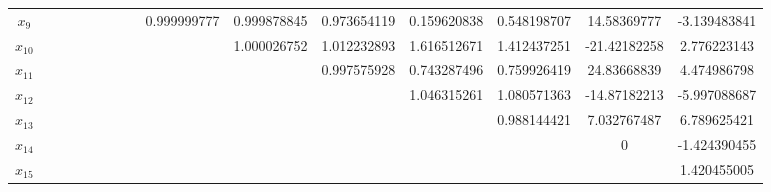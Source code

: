 \documentclass[a4paper]{article}
\begin{document}
\begin{CJK*}{GBK}{song}
\begin{center}
\begin{table*}[!htbp]
{\begin{threeparttable}[!htpb]
\begin{tabular}{ccccc ccccc ccccc}
$x_{9}$	&		&		&		&		&		&		&		&	0.999999777	&	0.999878845	&	0.973654119	&	0.159620838	&	0.548198707	&	14.58369777	&	-3.139483841	\\
$x_{10}$	&		&		&		&		&		&		&		&		&	1.000026752	&	1.012232893	&	1.616512671	&	1.412437251	&	-21.42182258	&	2.776223143	\\
$x_{11}$	&		&		&		&		&		&		&		&		&		&	0.997575928	&	0.743287496	&	0.759926419	&	24.83668839	&	4.474986798	\\
$x_{12}$	&		&		&		&		&		&		&		&		&		&		&	1.046315261	&	1.080571363	&	-14.87182213	&	-5.997088687	\\
$x_{13}$	&		&		&		&		&		&		&		&		&		&		&		&	0.988144421	&	7.032767487	&	6.789625421	\\
$x_{14}$	&		&		&		&		&		&		&		&		&		&		&		&		&	0	&	-1.424390455	\\
$x_{15}$	&		&		&		&		&		&		&		&		&		&		&		&		&		&	1.420455005	\\


 \bottomrule
\end{tabular}
\end{threeparttable}}%
\end{table*}
\end{center}


\end{CJK*}
\end{document}
